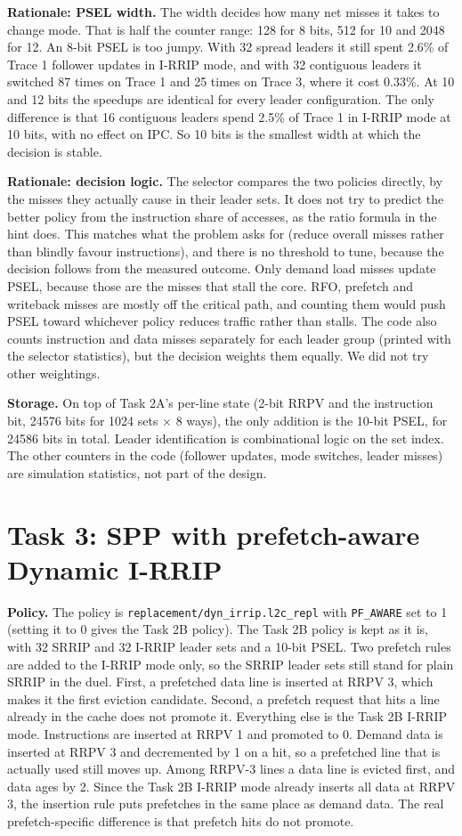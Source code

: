 \documentclass[10pt]{article}
\begin{document}
\textbf{Rationale: PSEL width.} The width decides how many net misses it takes to change mode. That is half the counter range: 128 for 8 bits, 512 for 10 and 2048 for 12. An 8-bit PSEL is too jumpy. With 32 spread leaders it still spent 2.6\% of Trace 1 follower updates in I-RRIP mode, and with 32 contiguous leaders it switched 87 times on Trace 1 and 25 times on Trace 3, where it cost 0.33\%. At 10 and 12 bits the speedups are identical for every leader configuration. The only difference is that 16 contiguous leaders spend 2.5\% of Trace 1 in I-RRIP mode at 10 bits, with no effect on IPC. So 10 bits is the smallest width at which the decision is stable.

\textbf{Rationale: decision logic.} The selector compares the two policies directly, by the misses they actually cause in their leader sets. It does not try to predict the better policy from the instruction share of accesses, as the ratio formula in the hint does. This matches what the problem asks for (reduce overall misses rather than blindly favour instructions), and there is no threshold to tune, because the decision follows from the measured outcome. Only demand load misses update PSEL, because those are the misses that stall the core. RFO, prefetch and writeback misses are mostly off the critical path, and counting them would push PSEL toward whichever policy reduces traffic rather than stalls. The code also counts instruction and data misses separately for each leader group (printed with the selector statistics), but the decision weights them equally. We did not try other weightings.

\textbf{Storage.} On top of Task 2A's per-line state (2-bit RRPV and the instruction bit, 24576 bits for 1024 sets $\times$ 8 ways), the only addition is the 10-bit PSEL, for 24586 bits in total. Leader identification is combinational logic on the set index. The other counters in the code (follower updates, mode switches, leader misses) are simulation statistics, not part of the design.

\section*{Task 3: SPP with prefetch-aware Dynamic I-RRIP}
\textbf{Policy.} The policy is \texttt{replacement/dyn\_irrip.l2c\_repl} with \texttt{PF\_AWARE} set to 1 (setting it to 0 gives the Task 2B policy). The Task 2B policy is kept as it is, with 32 SRRIP and 32 I-RRIP leader sets and a 10-bit PSEL. Two prefetch rules are added to the I-RRIP mode only, so the SRRIP leader sets still stand for plain SRRIP in the duel. First, a prefetched data line is inserted at RRPV 3, which makes it the first eviction candidate. Second, a prefetch request that hits a line already in the cache does not promote it. Everything else is the Task 2B I-RRIP mode. Instructions are inserted at RRPV 1 and promoted to 0. Demand data is inserted at RRPV 3 and decremented by 1 on a hit, so a prefetched line that is actually used still moves up. Among RRPV-3 lines a data line is evicted first, and data ages by 2. Since the Task 2B I-RRIP mode already inserts all data at RRPV 3, the insertion rule puts prefetches in the same place as demand data. The real prefetch-specific difference is that prefetch hits do not promote.
\end{document}
